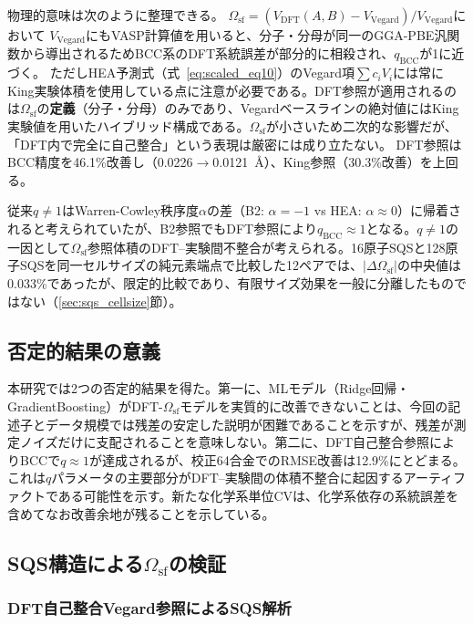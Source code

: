 \documentclass[5p,10pt]{elsarticle}
\begin{document}
物理的意味は次のように整理できる。
$\Omega_\text{sf} = (V_\text{DFT}(A,B) - V_\text{Vegard})/V_\text{Vegard}$において
$V_\text{Vegard}$にもVASP計算値を用いると、分子・分母が同一のGGA-PBE汎関数から導出されるためBCC系のDFT系統誤差が部分的に相殺され、$q_\text{BCC}$が1に近づく。
ただしHEA予測式（式~\ref{eq:scaled_eq10}）のVegard項$\sum c_i V_i$には常にKing実験体積を使用している点に注意が必要である。DFT参照が適用されるのは$\Omega_\text{sf}$の\textbf{定義}（分子・分母）のみであり、Vegardベースラインの絶対値にはKing実験値を用いたハイブリッド構成である。$\Omega_\text{sf}$が小さいため二次的な影響だが、「DFT内で完全に自己整合」という表現は厳密には成り立たない。
DFT参照はBCC精度を46.1\%改善し（0.0226$\to$0.0121~\AA{}）、King参照（30.3\%改善）を上回る。

従来$q \neq 1$はWarren-Cowley秩序度$\alpha$の差（B2: $\alpha = -1$ vs HEA: $\alpha \approx 0$）に帰着されると考えられていたが、B2参照でもDFT参照により$q_\text{BCC} \approx 1$となる。$q \neq 1$の一因として$\Omega_\text{sf}$参照体積のDFT--実験間不整合が考えられる。16原子SQSと128原子SQSを同一セルサイズの純元素端点で比較した12ペアでは、$\left|\Delta\Omega_\text{sf}\right|$の中央値は0.033\%であったが、限定的比較であり、有限サイズ効果を一般に分離したものではない（\ref{sec:sqs_cellsize}節）。


\subsection{否定的結果の意義}

本研究では2つの否定的結果を得た。第一に、MLモデル（Ridge回帰・GradientBoosting）がDFT-$\Omega_\text{sf}$モデルを実質的に改善できないことは、今回の記述子とデータ規模では残差の安定した説明が困難であることを示すが、残差が測定ノイズだけに支配されることを意味しない。第二に、DFT自己整合参照によりBCCで$q \approx 1$が達成されるが、校正64合金でのRMSE改善は12.9\%にとどまる。これは$q$パラメータの主要部分がDFT--実験間の体積不整合に起因するアーティファクトである可能性を示す。新たな化学系単位CVは、化学系依存の系統誤差を含めてなお改善余地が残ることを示している。


\subsection{SQS構造による$\Omega_\text{sf}$の検証}
\label{sec:sqs_improvement}

\subsubsection{DFT自己整合Vegard参照によるSQS解析}
\end{document}
